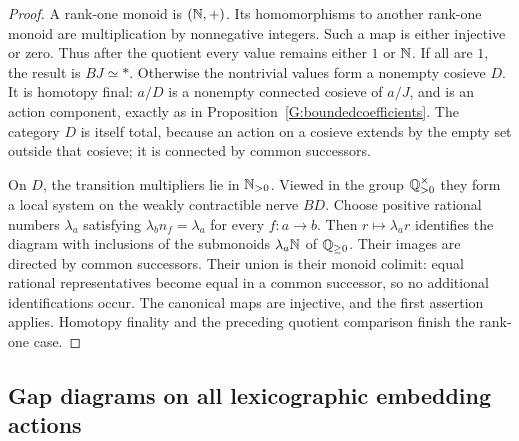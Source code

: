 \begin{proof}
A rank-one monoid is $(\mathbb N,+)$.  Its homomorphisms to another
rank-one monoid are multiplication by nonnegative integers.
Such a map is either injective or zero.  Thus after the
quotient every value remains either $1$ or $\mathbb N$.
If all are $1$, the result is $BJ\simeq *$.
Otherwise the nontrivial values form a nonempty cosieve $D$.
It is homotopy final: $a/D$ is a nonempty connected cosieve
of $a/J$, and is an action component, exactly as in
Proposition~\ref{G:boundedcoefficients}.
The category $D$ is itself total, because an action on a
cosieve extends by the empty set outside that cosieve; it is
connected by common successors.

On $D$, the transition multipliers lie in $\mathbb N_{>0}$.
Viewed in the group $\mathbb Q_{>0}^{\times}$ they form a local
system on the weakly contractible nerve $BD$.
Choose positive rational numbers $\lambda_a$ satisfying
$\lambda_b n_f=\lambda_a$ for every $f:a\to b$.
Then $r\mapsto\lambda_a r$ identifies the diagram with
inclusions of the submonoids $\lambda_a\mathbb N$ of $\mathbb Q_{\ge0}$.
Their images are directed by common successors.  Their union
is their monoid colimit: equal rational representatives
become equal in a common successor, so no additional
identifications occur.  The canonical maps are injective,
and the first assertion applies.  Homotopy finality and the
preceding quotient comparison finish the rank-one case.
\end{proof}

\subsection{Gap diagrams on all lexicographic embedding actions}

